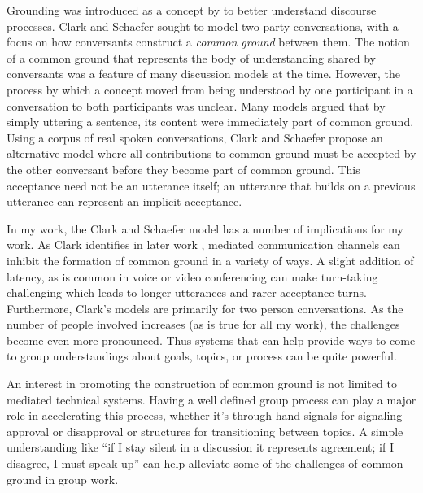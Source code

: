 Grounding was introduced as a concept by \citet{Clark:1989uc} to better understand discourse processes. Clark and Schaefer sought to model two party conversations, with a focus on how conversants construct a \emph{common ground} between them. The notion of a common ground that represents the body of understanding shared by conversants was a feature of many discussion models at the time. However, the process by which a concept moved from being understood by one participant in a conversation to both participants was unclear. Many models argued that by simply uttering a sentence, its content were immediately part of common ground. Using a corpus of real spoken conversations, Clark and Schaefer propose an alternative model where all contributions to common ground must be accepted by the other conversant before they become part of common ground. This acceptance need not be an utterance itself; an utterance that builds on a previous utterance can represent an implicit acceptance. 

In my work, the Clark and Schaefer model has a number of implications for my work. As Clark identifies in later work \citep{Brennan:1991wk}, mediated communication channels can inhibit the formation of common ground in a variety of ways. A slight addition of latency, as is common in voice or video conferencing can make turn-taking challenging which leads to longer utterances and rarer acceptance turns. Furthermore, Clark's models are primarily for two person conversations. As the number of people involved increases (as is true for all my work), the challenges become even more pronounced. Thus systems that can help provide ways to come to group understandings about goals, topics, or process can be quite powerful. 

An interest in promoting the construction of common ground is not limited to mediated technical systems. Having a well defined group process can play a major role in accelerating this process, whether it's through hand signals for signaling approval or disapproval or structures for transitioning between topics. A simple understanding like ``if I stay silent in a discussion it represents agreement; if I disagree, I must speak up'' can help alleviate some of the challenges of common ground in group work. 

